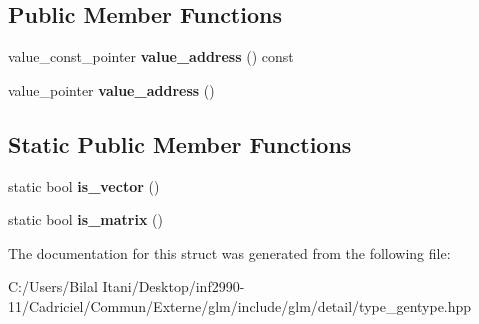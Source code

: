 \subsection*{Public Member Functions}
\begin{DoxyCompactItemize}
\item 
value\+\_\+const\+\_\+pointer {\bfseries value\+\_\+address} () const \hypertarget{structglm_1_1detail_1_1gen_type_a63fb77e77082f34c0a0d7faa0906f7f4}{}\label{structglm_1_1detail_1_1gen_type_a63fb77e77082f34c0a0d7faa0906f7f4}

\item 
value\+\_\+pointer {\bfseries value\+\_\+address} ()\hypertarget{structglm_1_1detail_1_1gen_type_a146973ec142766743080c1895a9e3c65}{}\label{structglm_1_1detail_1_1gen_type_a146973ec142766743080c1895a9e3c65}

\end{DoxyCompactItemize}
\subsection*{Static Public Member Functions}
\begin{DoxyCompactItemize}
\item 
static bool {\bfseries is\+\_\+vector} ()\hypertarget{structglm_1_1detail_1_1gen_type_ae83087df55201bdc46a37decf3d1c34c}{}\label{structglm_1_1detail_1_1gen_type_ae83087df55201bdc46a37decf3d1c34c}

\item 
static bool {\bfseries is\+\_\+matrix} ()\hypertarget{structglm_1_1detail_1_1gen_type_a78c650375558d5e2ccfba383cdb59479}{}\label{structglm_1_1detail_1_1gen_type_a78c650375558d5e2ccfba383cdb59479}

\end{DoxyCompactItemize}


The documentation for this struct was generated from the following file\+:\begin{DoxyCompactItemize}
\item 
C\+:/\+Users/\+Bilal Itani/\+Desktop/inf2990-\/11/\+Cadriciel/\+Commun/\+Externe/glm/include/glm/detail/type\+\_\+gentype.\+hpp\end{DoxyCompactItemize}
